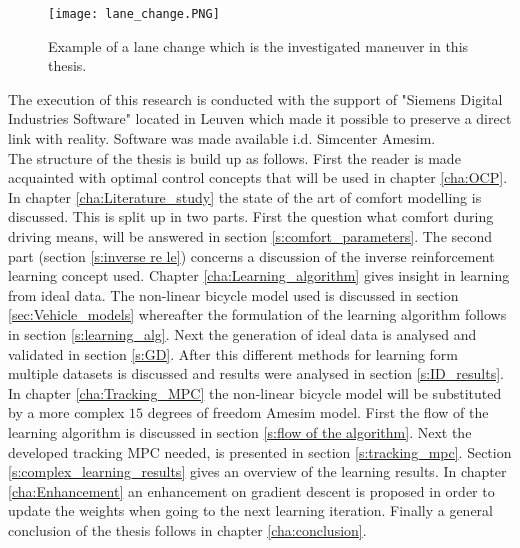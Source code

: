 \begin{figure}[htp]
	\centering
	\texttt{[image: lane\_change.PNG]}
	\caption{Example of a lane change which is the investigated maneuver in this thesis.}
	\label{fig:lane_change}
\end{figure}

The execution of this research is conducted with the support of "Siemens Digital Industries Software" located in Leuven which made it possible to preserve a direct link with reality. Software was made available i.d. Simcenter Amesim.\\

The structure of the thesis is build up as follows. First the reader is made acquainted with optimal control concepts that will be used in chapter \ref{cha:OCP}. In chapter \ref{cha:Literature_study} the state of the art of comfort modelling is discussed. This is split up in two parts. First the question what comfort during driving means, will be answered in section \ref{s:comfort_parameters}. The second part (section \ref{s:inverse re le}) concerns a discussion of the inverse reinforcement learning concept used. Chapter \ref{cha:Learning_algorithm} gives insight in learning from ideal data. The non-linear bicycle model used is discussed in section \ref{sec:Vehicle_models} whereafter the formulation of the learning algorithm follows in section \ref{s:learning_alg}. Next the generation of ideal data is analysed and validated in section \ref{s:GD}. After this different methods for learning form multiple datasets is discussed and results were analysed in section \ref{s:ID_results}. In chapter \ref{cha:Tracking_MPC} the non-linear bicycle model will be substituted by a more complex $15$ degrees of freedom Amesim model. First the flow of the learning algorithm is discussed in section \ref{s:flow of the algorithm}. Next the developed tracking MPC needed, is presented in section \ref{s:tracking_mpc}. Section \ref{s:complex_learning_results} gives an overview of the learning results. 
In chapter \ref{cha:Enhancement} an enhancement on gradient descent is proposed in order to update the weights when going to the next learning iteration. Finally a general conclusion of the thesis follows in chapter \ref{cha:conclusion}.\\


